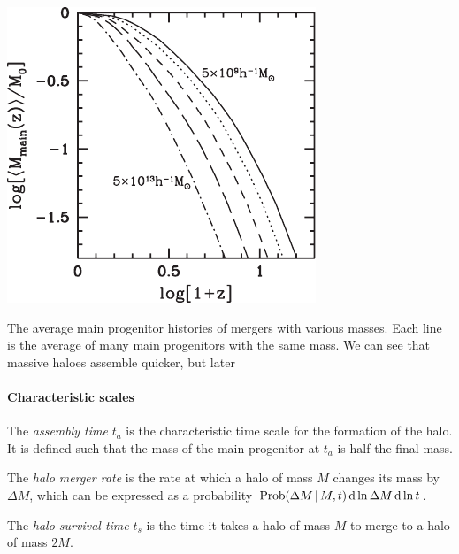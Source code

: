 \begin{marginfigure}
	\includegraphics[width=\textwidth]{img/ch-04/progenitor-average.pdf}
	\caption{The average main progenitor histories of mergers with various masses. Each line is the average of many main progenitors with the same mass. We can see that massive haloes assemble quicker, but later}
	\label{fig:progenitor-average}
\end{marginfigure}



\paragraph*{Characteristic scales}

The \emph{assembly time} $t_a$ is the characteristic time scale for the formation of the halo.
It is defined such that the mass of the main progenitor at $t_a$ is half the final mass.

The \emph{halo merger rate} is the rate at which a halo of mass $M$ changes its mass by $\Delta M$, which can be expressed as a probability $\operatorname{Prob}(\Delta M \, | \, M, t) \dd{\ln \Delta M} \dd{\ln t}$.

The \emph{halo survival time} $t_s$ is the time it takes a halo of mass $M$ to merge to a halo of mass $2 M$.






